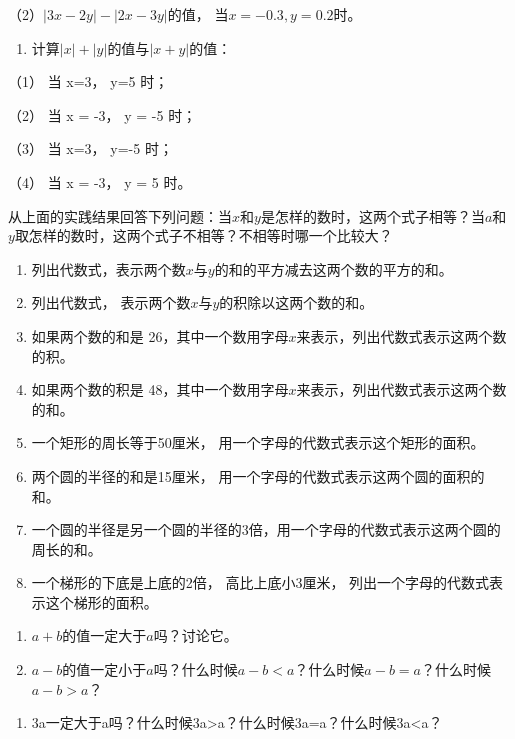 （2）\(|3x-2y|-|2x-3y|\)的值， 当\(x=-0.3, y=0.2\)时。

\begin{enumerate}[start=6]
\item
  计算\(|x| + |y|\)的值与\(|x + y|\)的值：
\end{enumerate}

（1） 当 x=3， y=5 时；

（2） 当 x = -3， y = -5 时；

（3） 当 x=3， y=-5 时；

（4） 当 x = -3， y = 5 时。

从上面的实践结果回答下列问题：当\(x\)和\(y\)是怎样的数时，这两个式子相等？当\(a\)和\(y\)取怎样的数时，这两个式子不相等？不相等时哪一个比较大？

\begin{enumerate}[start=7]
\item
  列出代数式，表示两个数\(x\)与\(y\)的和的平方减去这两个数的平方的和。
\item
  列出代数式， 表示两个数\(x\)与\(y\)的积除以这两个数的和。
\item
  如果两个数的和是
  26，其中一个数用字母\(x\)来表示，列出代数式表示这两个数的积。
\item
  如果两个数的积是
  48，其中一个数用字母\(x\)来表示，列出代数式表示这两个数的和。
\item
  一个矩形的周长等于50厘米， 用一个字母的代数式表示这个矩形的面积。
\item
  两个圆的半径的和是15厘米， 用一个字母的代数式表示这两个圆的面积的和。
\item
  一个圆的半径是另一个圆的半径的3倍，用一个字母的代数式表示这两个圆的周长的和。
\item
  一个梯形的下底是上底的2倍， 高比上底小3厘米，
  列出一个字母的代数式表示这个梯形的面积。
\end{enumerate}

\begin{enumerate}[start=15]
\item
  \(a + b\)的值一定大于\(a\)吗？讨论它。
\item
  \(a - b\)的值一定小于\(a\)吗？什么时候\(a - b < a\)？什么时候\(a - b = a\)？什么时候\(a - b > a\)？
\end{enumerate}

\begin{enumerate}[start=17]
\item
  3a一定大于a吗？什么时候3a\textgreater a？什么时候3a=a？什么时候3a\textless a？
\end{enumerate}

